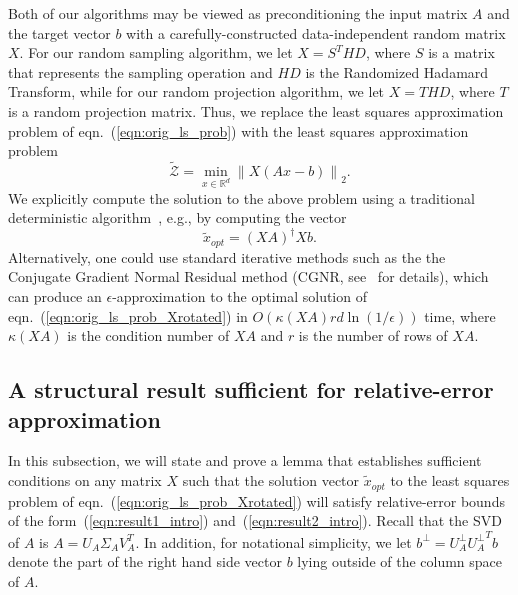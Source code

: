 \documentclass[11pt]{article}
\newcommand{\VTTNorm }[1]{\mbox{}\left\|#1\right\|_2  }
\begin{document}
Both of our algorithms may be viewed as preconditioning the input matrix $A$ and the target vector $b$ with a carefully-constructed data-independent random matrix $X$. For our random sampling algorithm, we let $X = S^THD$, where $S$ is a matrix that represents the sampling operation and $HD$ is the Randomized Hadamard Transform, while for our random projection algorithm, we let $X = THD$, where $T$ is a random projection matrix. Thus, we replace the least squares approximation problem of eqn.~(\ref{eqn:orig_ls_prob}) with the least squares approximation problem
\begin{equation}
\label{eqn:orig_ls_prob_Xrotated}
\tilde{\mathcal{Z}} = \min_{x \in \mathbb{R}^d} \VTTNorm{X (Ax - b)}.
\end{equation}
We explicitly compute the solution to the above problem using a traditional deterministic algorithm~\cite{GVL96}, e.g., by computing the vector
\begin{equation}
\label{eqn:xopt_orig_ls_prob_Xrotated}
\tilde{x}_{opt} = \left(XA\right)^{\dagger}Xb  .
\end{equation}
Alternatively, one could use standard iterative methods such as the the Conjugate Gradient Normal Residual method (CGNR, see~\cite{GVL96} for details), which can produce an $\epsilon$-approximation to the optimal solution of eqn.~(\ref{eqn:orig_ls_prob_Xrotated}) in $O(\kappa(XA) rd \ln(1/\epsilon) )$ time, where $\kappa(XA)$ is the condition number of $XA$ and $r$ is the number of rows of $XA$.

\subsection{A structural result sufficient for relative-error approximation}
\label{sxn:sampling:proofs:structural}

In this subsection, we will state and prove a lemma that establishes sufficient conditions on any matrix $X$ such that the solution vector $\tilde{x}_{opt}$ to the least squares problem of eqn.~(\ref{eqn:orig_ls_prob_Xrotated}) will satisfy relative-error bounds of the form~(\ref{eqn:result1_intro}) and~(\ref{eqn:result2_intro}). Recall that the SVD of $A$ is $A=U_A\Sigma_AV_A^T$. In addition, for notational simplicity, we let $b^{\perp} = U_A^{\perp}{U_A^{\perp}}^{T}b$ denote the  part of the right hand side vector $b$ lying outside of the column space of $A$.
\end{document}
